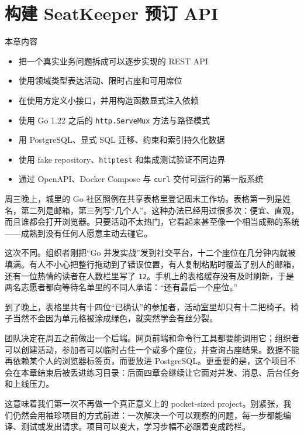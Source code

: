 \chapter{构建 SeatKeeper 预订 API}
\label{ch:seatkeeper-api}

\begin{infobox}{本章内容}
\begin{itemize}
  \item 把一个真实业务问题拆成可以逐步实现的 REST API
  \item 使用领域类型表达活动、限时占座和可用席位
  \item 在使用方定义小接口，并用构造函数显式注入依赖
  \item 使用 Go 1.22 之后的 \texttt{http.ServeMux} 方法与路径模式
  \item 用 PostgreSQL、显式 SQL 迁移、约束和索引持久化数据
  \item 使用 fake repository、\texttt{httptest} 和集成测试验证不同边界
  \item 通过 OpenAPI、Docker Compose 与 \texttt{curl} 交付可运行的第一版系统
\end{itemize}
\end{infobox}

周三晚上，城里的 Go 社区照例在共享表格里登记周末工作坊。表格第一列是姓名，第二列是邮箱，第三列写“几个人”。这种办法已经用过很多次：便宜、直观，而且谁都会打开浏览器。只要活动不太热门，它看起来甚至像一个相当成熟的系统——成熟到没有任何人愿意主动去碰它。

这次不同。组织者刚把“Go 并发实战”发到社交平台，十二个座位在几分钟内就被填满。有人不小心把整行拖动到了错误位置，有人复制粘贴时覆盖了别人的邮箱，还有一位热情的读者在人数栏里写了 \texttt{12}。手机上的表格缓存没有及时刷新，于是两名志愿者都向等待名单里的不同人承诺：“还有最后一个座位。”

到了晚上，表格里共有十四位“已确认”的参加者，活动室里却只有十二把椅子。椅子当然不会因为单元格被涂成绿色，就突然学会有丝分裂。

团队决定在周五之前做出一个后端。网页前端和命令行工具都要能调用它；组织者可以创建活动，参加者可以临时占住一个或多个座位，并查询占座结果。数据不能再依赖某个人的浏览器标签页，而要放进 PostgreSQL。更重要的是，这个项目不会在本章结束后被丢进练习目录：后面四章会继续让它面对并发、消息、后台任务和上线压力。

这意味着我们第一次不再做一个真正意义上的 pocket-sized project。别紧张，我们仍然会用袖珍项目的方式前进：一次解决一个可以观察的问题，每一步都能编译、测试或发出请求。项目可以变大，学习步幅不必跟着变成跨栏。

